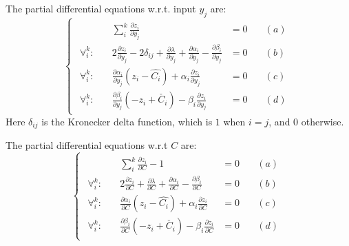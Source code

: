 \documentclass[11 pt]{article}
\begin{document}
The partial differential equations w.r.t. input $y_j$ are:
\begin{equation}\label{eqns_wrt_y_j}
    \begin{cases}
        \begin{aligned}
            & \sum_i^k \frac{\partial z_i}{\partial y_j} & = 0 &\quad (a)\\
            
            \forall_i^k : \quad & 2\frac{\partial z_i}{\partial y_j} - 2\delta_{ij} + \frac{\partial \lambda}{\partial y_j} + \frac{\partial \alpha_i}{\partial y_j} - \frac{\partial \beta_i}{\partial y_j} & = 0 &\quad (b)\\
            
            \forall_i^k : \quad & \frac{\partial \alpha_i}{\partial y_j}(z_i - \hat{C_i}) + \alpha_i \frac{\partial z_i}{\partial y_j} & = 0 &\quad (c)\\
            
            \forall_i^k : \quad & \frac{\partial \beta_i}{\partial y_j}(-z_i + \check{C_i}) - \beta_i \frac{\partial z_i}{\partial y_j}& = 0 &\quad (d)
        \end{aligned}
    \end{cases}
\end{equation}
Here $\delta_{ij}$ is the Kronecker delta function, which is $1$ when $i=j$, and $0$ otherwise.

The partial differential equations w.r.t $C$ are:
\begin{equation}\label{eqns_wrt_C}
    \begin{cases}
        \begin{aligned}
            & \sum_i^k \frac{\partial z_i}{\partial C} - 1 & = 0 &\quad (a)\\
            
            \forall_i^k : \quad & 2\frac{\partial z_i}{\partial C} + \frac{\partial \lambda}{\partial C} + \frac{\partial \alpha_i}{\partial C} - \frac{\partial \beta_i}{\partial C} & = 0 &\quad (b) \\
            
            \forall_i^k : \quad & \frac{\partial \alpha_i}{\partial C}(z_i - \hat{C_i}) + \alpha_i \frac{\partial z_i}{\partial C} & = 0 &\quad (c) \\
            
            \forall_i^k : \quad & \frac{\partial \beta_i}{\partial C}(-z_i + \check{C_i}) - \beta_i \frac{\partial z_i}{\partial C}& = 0 &\quad (d)
        \end{aligned}
    \end{cases}
\end{equation}
\end{document}
